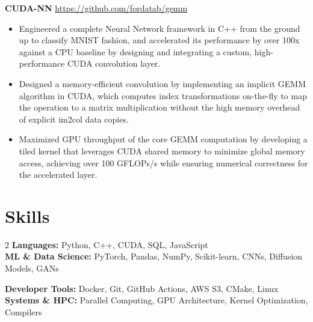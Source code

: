 \documentclass[11pt]{article}       %
\begin{document}
\textbf{CUDA-NN} \hfill \href{https://github.com/fordatab/gemm}{https://github.com/fordatab/gemm} \
\vspace{-10pt}
\begin{itemize}
\item Engineered a complete Neural Network framework in C++ from the ground up to classify MNIST fashion, and accelerated its performance by over 100x against a CPU baseline by designing and integrating a custom, high-performance CUDA convolution layer.
\item Designed a memory-efficient convolution by implementing an implicit GEMM algorithm in CUDA, which computes index transformations on-the-fly to map the operation to a matrix multiplication without the high memory overhead of explicit im2col data copies.
\item Maximized GPU throughput of the core GEMM computation by developing a tiled kernel that leverages CUDA shared memory to minimize global memory access, achieving over 100 GFLOPs/s while ensuring numerical correctness for the accelerated layer.
\end{itemize}


\vspace{-26.5pt}

\section*{Skills}
\noindent\begin{minipage}{\textwidth}


\begin{multicols}{2}
    \noindent\textbf{Languages:} Python, C++, CUDA, SQL, JavaScript \\
    \textbf{ML \& Data Science:} PyTorch, Pandas, NumPy, Scikit-learn, CNNs, Diffusion Models, GANs \\

    
    \columnbreak %
    
    \noindent\textbf{Developer Tools:} Docker, Git, GitHub Actions, AWS S3, CMake, Linux \\
        \textbf{Systems \& HPC:} Parallel Computing, GPU Architecture, Kernel Optimization, Compilers
\end{multicols}
\end{minipage}
\end{document}
